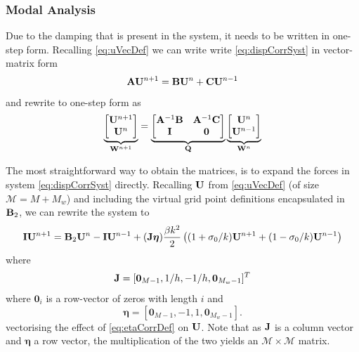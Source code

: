 \subsubsection{Modal Analysis}
Due to the damping that is present in the system, it needs to be written in one-step form. Recalling \eqref{eq:uVecDef} we can write write \eqref{eq:dispCorrSyst} in vector-matrix form
\begin{equation}\label{eq:formForOneStep}
    \mathbf{A} \mathbf{U}^{n+1} = \mathbf{B} \mathbf{U}^n + \mathbf{C}\mathbf{U}^{n-1}
\end{equation}
and rewrite to one-step form as
\begin{equation}\label{eq:oneStepForm}
    \underbrace{\begin{bmatrix}
        \mathbf{U}^{n+1}\\
        \mathbf{U}^n
    \end{bmatrix}}_{\mathbf{W}^{n+1}} = 
    \underbrace{\begin{bmatrix}
        \mathbf{A}^{-1}\mathbf{B} & \mathbf{A}^{-1}\mathbf{C}\\
        \mathbf{I} & \mathbf{0}
    \end{bmatrix}}_{\mathbf{Q}}
    \underbrace{\begin{bmatrix}
        \mathbf{U}^n\\
        \mathbf{U}^{n-1}
    \end{bmatrix}}_{\mathbf{W}^n}
\end{equation}

The most straightforward way to obtain the matrices, is to expand the forces in system \eqref{eq:dispCorrSyst} directly. 
Recalling $\mathbf{U}$ from \eqref{eq:uVecDef} (of size $\mathcal{M} = M+M_w$) and including the virtual grid point definitions encapsulated in $\mathbf{B}_2$, we can rewrite the system to
\begin{equation}
    \mathbf{I}\mathbf{U}^{n+1} = \mathbf{B}_2\mathbf{U}^n - \mathbf{I}\mathbf{U}^{n-1} + (\mathbf{J}\boldsymbol{\eta})\frac{\beta k^2}{2}\left((1+\sigma_0/k)\mathbf{U}^{n+1} + (1-\sigma_0/k)\mathbf{U}^{n-1}\right)
\end{equation}
where 
\begin{equation}
    \mathbf{J} = [\mathbf{0}_{M-1}, 1/h, -1/h, \mathbf{0}_{M_w-1}]^T
\end{equation}
where $\mathbf{0}_i$ is a row-vector of zeros with length $i$ and
\begin{equation}
    \boldsymbol{\eta} = [\mathbf{0}_{M-1}, -1, 1, \mathbf{0}_{M_w-1}].
\end{equation}
vectorising the effect of \eqref{eq:etaCorrDef} on $\mathbf{U}$. Note that as $\mathbf{J}$ is a column vector and $\boldsymbol{\eta}$ a row vector, the multiplication of the two yields an $\mathcal{M}\times\mathcal{M}$ matrix.

